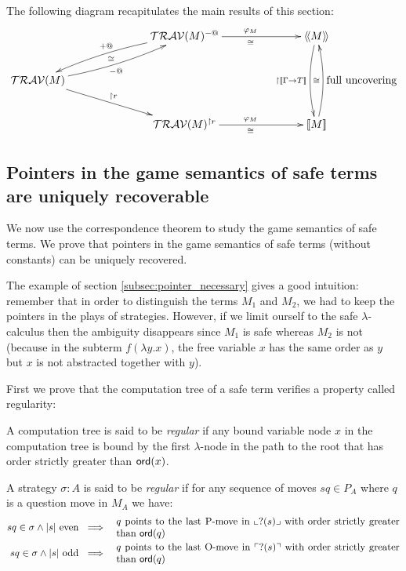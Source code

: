 The following diagram recapitulates the main results of this section:
$$
\xymatrix @C=6pc{
                                           & \travset(M)^{-@} \ar@/_/[dl]_{+@}  \ar[r]^{\varphi_M}_\cong & \intersem{M} \ar@/_/[dd]_{\upharpoonright \sem{\Gamma\rightarrow T}} \\
\travset(M) \ar@/_/[ur]_{-@}^{\cong} \ar[dr]^{\upharpoonright r}  \\
                                           & \travset(M)^{\upharpoonright r} \ar[r]^{\varphi_M}_\cong & \sem{M} \ar@/_/[uu]^{\cong}_{\mbox{full uncovering}}
}
$$



\subsection{Pointers in the game semantics of safe terms are uniquely recoverable}
We now use the correspondence theorem to study the game semantics of
safe terms. We prove that pointers in the game semantics of
safe terms (without constants) can be uniquely recovered.

The example of section \ref{subsec:pointer_necessary} gives a good
intuition: remember that in order to distinguish the terms $M_1$ and
$M_2$, we had to keep the pointers in the plays of strategies.
However, if we limit ourself to the safe $\lambda$-calculus then the
ambiguity disappears since $M_1$ is safe whereas $M_2$ is not (because
in the subterm $f (\lambda y . x)$, the free variable $x$ has the same
order as $y$ but $x$ is not abstracted together with $y$).

First we prove that the computation tree of a safe term verifies a
property called regularity:

\begin{dfn}
A computation tree is said to be \emph{regular} if any bound variable node $x$ in the computation tree is bound
by the first $\lambda$-node in the path to the root that has
order strictly greater than ${\sf ord}(x)$.
\end{dfn}


\begin{dfn}
A strategy $\sigma : A$ is said to be \emph{regular} if for any sequence of moves $s q \in P_A$
where $q$ is a question move in $M_A$ we have:
\begin{eqnarray*}
s q \in \sigma \wedge |s| \mbox{ even } &\implies& \parbox{10cm}{$q$ points to the last P-move in $\oview{?(s)}$ with order strictly greater than $\ord{q}$} \\
s q \in \sigma \wedge |s| \mbox{ odd } &\implies& \parbox{10cm}{$q$  points to the last O-move in $\pview{?(s)}$ with order strictly greater than $\ord{q}$}
\end{eqnarray*}
\end{dfn}

